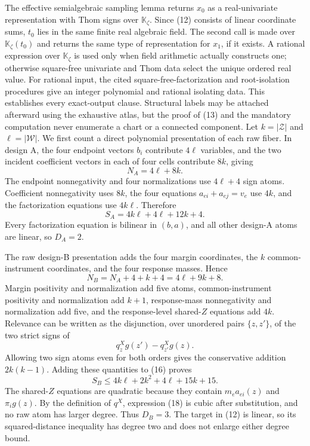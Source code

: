 The effective semialgebraic sampling lemma returns \(x_0\) as a real-univariate representation with Thom signs over \(\mathbb K_{\zeta}\).  Since (12) consists of linear coordinate sums, \(t_0\) lies in the same finite real algebraic field.  The second call is made over \(\mathbb K_{\zeta}(t_0)\) and returns the same type of representation for \(x_1\), if it exists.  A rational expression over \(\mathbb K_{\zeta}\) is used only when field arithmetic actually constructs one; otherwise square-free univariate and Thom data select the unique ordered real value.  For rational input, the cited square-free-factorization and root-isolation procedures give an integer polynomial and rational isolating data.  This establishes every exact-output clause.  Structural labels may be attached afterward using the exhaustive atlas, but the proof of (13) and the mandatory computation never enumerate a chart or a connected component.
Let \(k=|\mathcal Z|\) and \(\ell=|\mathcal W|\).  We first count a direct polynomial presentation of each raw fiber.  In design A, the four endpoint vectors \(b_i\) contribute \(4\ell\) variables, and the two incident coefficient vectors in each of four cells contribute \(8k\), giving
\[
N_A=4\ell+8k.                                                \tag{15}
\]
The endpoint nonnegativity and four normalizations use \(4\ell+4\) sign atoms.  Coefficient nonnegativity uses \(8k\), the four equations \(a_{ei}+a_{ej}=v_e\) use \(4k\), and the factorization equations use \(4k\ell\).  Therefore
\[
S_A=4k\ell+4\ell+12k+4.                                    \tag{16}
\]
Every factorization equation is bilinear in \((b,a)\), and all other design-A atoms are linear, so \(D_A=2\).

The raw design-B presentation adds the four margin coordinates, the \(k\) common-instrument coordinates, and the four response masses.  Hence
\[
N_B=N_A+4+k+4=4\ell+9k+8.                                  \tag{17}
\]
Margin positivity and normalization add five atoms, common-instrument positivity and normalization add \(k+1\), response-mass nonnegativity and normalization add five, and the response-level shared-\(Z\) equations add \(4k\).  Relevance can be written as the disjunction, over unordered pairs \(\{z,z'\}\), of the two strict signs of
\[
q^X_zg(z')-q^X_{z'}g(z).                                    \tag{18}
\]
Allowing two sign atoms even for both orders gives the conservative addition \(2k(k-1)\).  Adding these quantities to (16) proves
\[
S_B\leq4k\ell+2k^2+4\ell+15k+15.                           \tag{19}
\]
The shared-\(Z\) equations are quadratic because they contain \(m_ea_{ei}(z)\) and \(\pi_i g(z)\).  By the definition of \(q^X\), expression (18) is cubic after substitution, and no raw atom has larger degree.  Thus \(D_B=3\).  The target in (12) is linear, so its squared-distance inequality has degree two and does not enlarge either degree bound.

